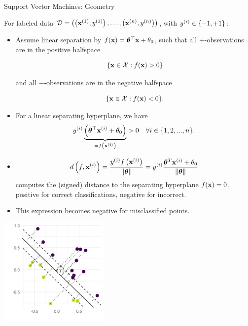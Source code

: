 \documentclass[11pt,compress,t,notes=noshow, xcolor=table]{beamer}
\begin{document}





\begin{vbframe}{Support Vector Machines: Geometry}

For labeled data $\mathcal{D} = \left( \left(\mathbf{x}^{(1)}, y^{(1)}\right), \ldots, \left(\mathbf{x}^{(n)}, y^{(n)}\right)\right)$, with $y^{(i)} \in \{-1, +1\}$:
\begin{itemize}
  \item Assume linear separation by $f(\mathbf{x}) = \bm{\theta}^\top \mathbf{x} + \theta_0$, such that all $+$-observations are in the positive halfspace

  $$
  \phantom{i}\{\mathbf{x} \in \mathcal{X}: f(\mathbf{x}) > 0\}
  $$

  and all $-$-observations are in the negative halfspace

  $$
  \phantom{i}\{\mathbf{x} \in \mathcal{X} : f(\mathbf{x}) < 0\}.
  $$

  \item For a linear separating hyperplane, we have
  $$
    y^{(i)} \underbrace{\left(\bm{\theta}^\top \mathbf{x}^{(i)} + \theta_0\right)}_{= f\left(\mathbf{x}^{(i)}\right)} > 0 \quad \forall i \in \{1, 2, ..., n\}.
  $$

  \item 
  $$
    d \left(f, \mathbf{x}^{(i)} \right) = \frac{y^{(i)} f\left(\mathbf{x}^{(i)}\right)}{\|\bm{\theta}\|} = y^{(i)} \frac{\bm{\theta}^T \mathbf{x}^{(i)} + \theta_0}{\|\bm{\theta}\|}
  $$
  computes the (signed) distance to the separating hyperplane $f(\mathbf{x}) = 0$,
    positive for correct classifications, negative for incorrect.
  \item This expression becomes negative for misclassified points.
\end{itemize}


\begin{center}
\includegraphics[width=0.4\textwidth]{figure/svm_geometry.png} \\
\end{center}



\end{vbframe}
\end{document}
